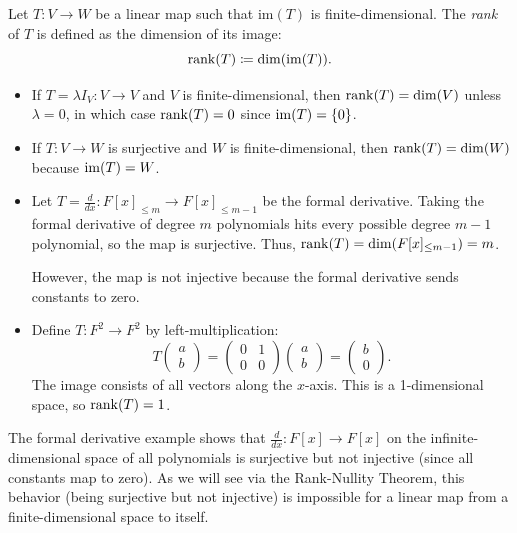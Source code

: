 \documentclass[../linear_algebra_and_groups.tex]{subfiles}
\begin{document}
\begin{definition}[Rank]
    \begin{shaded*}
        Let $T:V\to W$ be a linear map such that $\mathrm{im}(T)$ is finite-dimensional. The \textit{rank} of $T$ is defined as the dimension of its image:
        \[ \operatorname{rank}(T) \coloneqq \dim(\mathrm{im}(T)). \]
    \end{shaded*}
\end{definition}

\begin{example}
    \begin{itemize}
        \item If $T = \lambda I_V : V\to V$ and $V$ is finite-dimensional, then $\operatorname{rank}(T) = \dim(V)$ unless $\lambda=0$, in which case $\operatorname{rank}(T)=0$ since $\operatorname{im}(T)=\{0\}$.
        \item If $T: V \to W$ is surjective and $W$ is finite-dimensional, then $\operatorname{rank}(T) = \dim(W)$ because $\operatorname{im}(T) = W$.
        \item Let $T = \frac{d}{dx} : F[x]_{\le m} \to F[x]_{\le m-1}$ be the formal derivative. Taking the formal derivative of degree $m$ polynomials hits every possible degree $m-1$ polynomial, so the map is surjective. Thus, $\operatorname{rank}(T) = \dim(F[x]_{\le m-1}) = m$.\par
        However, the map is not injective because the formal derivative sends constants to zero.
        \item Define $T: F^2 \to F^2$ by left-multiplication:
        \[ T\begin{pmatrix} a \\ b \end{pmatrix} = \begin{pmatrix} 0 & 1 \\ 0 & 0 \end{pmatrix}\begin{pmatrix} a \\ b \end{pmatrix} = \begin{pmatrix} b \\ 0 \end{pmatrix}. \]
        The image consists of all vectors along the $x$-axis. This is a 1-dimensional space, so $\operatorname{rank}(T) = 1$.
    \end{itemize}
\end{example}

\begin{remark}
    The formal derivative example shows that $\frac{d}{dx} : F[x] \to F[x]$ on the infinite-dimensional space of all polynomials is surjective but not injective (since all constants map to zero). As we will see via the Rank-Nullity Theorem, this behavior (being surjective but not injective) is impossible for a linear map from a finite-dimensional space to itself.
\end{remark}
\end{document}
